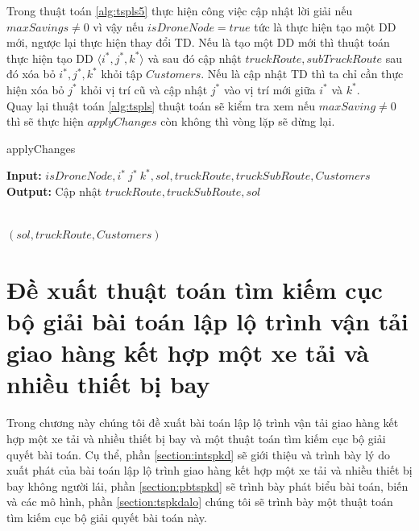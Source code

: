 \documentclass[a4paper,12pt]{report}
\begin{document}
Trong thuật toán \ref{alg:tspls5} thực hiện công việc cập nhật lời giải nếu $maxSavings \neq 0$ vì vậy nếu $isDroneNode=true $ tức là thực hiện tạo một \ac{DD} mới, ngược lại thực hiện thay đổi \ac{TD}. Nếu là tạo một \ac{DD} mới thì thuật toán thực hiện tạo \ac{DD} $\langle i^*,j^*,k^* \rangle$ và sau đó cập nhật $truckRoute,subTruckRoute$ sau đó xóa bỏ $i^*,j^*,k^*$ khỏi tập $Customers$. Nếu là cập nhật \ac{TD} thì ta chỉ cần thực hiện xóa bỏ $j^*$ khỏi vị trí cũ và cập nhật $j^*$ vào vị trí mới giữa $i^*$ và $k^*$. \\

Quay lại thuật toán \ref{alg:tspls} thuật toán sẽ kiểm tra xem nếu $maxSaving \neq 0$ thì sẽ thực hiện $applyChanges$ còn không thì vòng lặp sẽ dừng lại.
\begin{algorithm}[H]
\caption{applyChanges}
\textbf{Input:} $isDroneNode,i^* \ j^* \ k^*,sol,truckRoute,truckSubRoute,Customers$\\
\textbf{Output:} Cập nhật $truckRoute,truckSubRoute,sol$\\
\begin{algorithmic}[1]
\Else 
{}
\EndIf
{} \\
\Return 	$(sol,truckRoute,Customers)$
\end{algorithmic}

\label{alg:tspls5}
\end{algorithm}
\chapter{Đề xuất thuật toán tìm kiếm cục bộ  giải bài toán  lập lộ trình vận tải giao hàng kết hợp một xe tải và nhiều thiết bị bay}
\label{chapter:tspkd}
Trong chương này chúng tôi đề xuất bài toán lập lộ trình vận tải giao hàng kết hợp một xe tải và nhiều thiết bị bay và một thuật toán tìm kiếm cục bộ giải quyết bài toán. Cụ thể, phần \ref{section:intspkd} sẽ giới thiệu và trình bày lý do xuất phát của bài toán lập lộ trình giao hàng kết hợp một xe tải và  nhiều thiết bị bay không người lái, phần \ref{section:pbtspkd} sẽ trình bày phát biểu bài toán, biến và các mô hình, phần \ref{section:tspkdalo} chúng tôi sẽ trình bày một thuật toán tìm kiếm cục bộ giải quyết bài toán này.
\end{document}
